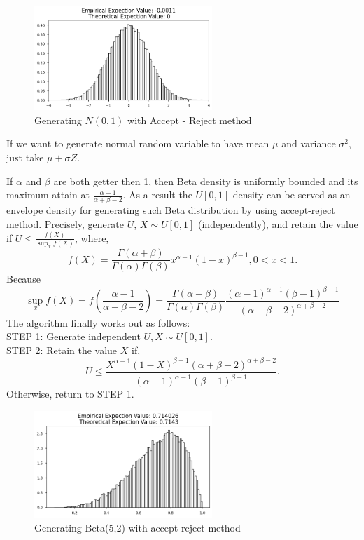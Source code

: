 \begin{example}
\begin{figure}[H]
    
    \centering
    \includegraphics[width=0.6\textwidth]{images/nor_AR.png}
    \caption{Generating $N(0,1)$ with Accept - Reject method}
\end{figure}

If we want to generate normal random variable to have mean $\mu$  and variance $\sigma^2 $, just take $\mu +\sigma Z $.
\end{example}

\begin{example}
    \label{generate beta}
    If $\alpha$ and  $\beta $ are both getter then 1, then Beta density is uniformly bounded and its maximum attain at 
    $\frac{\alpha-1}{\alpha+\beta-2}$. As a result the $U[0,1]$ density can be served as an envelope density for generating such Beta distribution by using accept-reject method.
    Precisely, generate $U$, $X\sim U[0,1]$ (independently), and retain the value if 
    $U\le \frac{f(X)}{\sup_x f(X)}$, where,
    \[
        f(X)=\frac{\Gamma(\alpha+\beta)}{\Gamma(\alpha)\Gamma(\beta)}x^{\alpha-1} (1-x)^{\beta-1}, 0 < x< 1. 
    \]
    Because
    \[
        \sup_x f(X) = f\left( \frac{\alpha-1}{\alpha+\beta-2} \right) = \frac{\Gamma(\alpha+\beta)}{\Gamma(\alpha)\Gamma(\beta)}\frac{(\alpha-1)^{\alpha-1} (\beta-1)^{\beta-1} }{(\alpha+\beta-2)^{\alpha+\beta-2} }
    \]
    The algorithm finally works out as follows:\\ 
    STEP 1: Generate independent $U,X \sim U[0,1]$.\\ 
    STEP 2: Retain the value $X$ if,
    \[
        U \le \frac{X^{\alpha-1} (1-X)^{\beta -1} (\alpha+\beta-2)^{\alpha+\beta-2} }{(\alpha-1)^{\alpha-1} (\beta-1)^{\beta-1} }.
    \]
    Otherwise, return to STEP 1.

    \begin{figure}[H]
        \centering
        \includegraphics[width=0.6\textwidth]{images/beta_AR.png}
        \caption{Generating Beta(5,2) with accept-reject method}
        \label{Beta 5 2}
    \end{figure}
\end{example}

